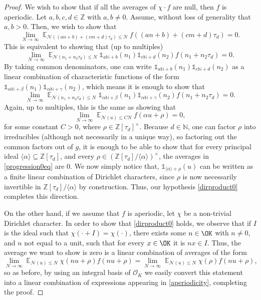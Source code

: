 \documentclass[11pt]{amsart}
\theoremstyle{definition}
\DeclareMathOperator*{\E}{\mathbb{E}}
\newcommand{\N}{{\mathbb N}}
\newcommand{\NN}{{\mathcal N}}
\newcommand{\Z}{{\mathbb Z}}
\begin{document}
\begin{proof}
We wish to show that if all the averages of $\chi\cdot f$ are null, then $f$ is aperiodic. %
Let $a,b,c,d \in \Z$ with $a,b \neq 0$. Assume, without loss of generality that $a, b>0$. Then, we wish to show that
\begin{equation}\label{aperiodicity}
\lim_{N\to\infty}\E_{\NN((an+b)+(cm+d)\tau_{d}) \leq N}f((an+b)+(cm+d)\tau_{d})=0.
\end{equation}
This is equivalent to showing that (up to multiples)
\[
\lim_{N\to\infty}\E_{\NN(n_1+n_2\tau_{d}) \leq N}\mathds{1}_{a\N+b}(n_1)\mathds{1}_{c\N+d}(n_2)f(n_1+n_2\tau_{d})=0.
\]
By taking common denominators, one can write $\mathds{1}_{a\N+b}(n_1)\mathds{1}_{c\N+d}(n_2)$ as a linear combination of characteristic functions of the form $\mathds{1}_{\alpha\N+\beta}(n_1)\mathds{1}_{\alpha\N+\gamma}(n_2)$, which means it is enough to show that
\[
\lim_{N\to\infty}\E_{\NN(n_1+n_2\tau_{d}) \leq N}\mathds{1}_{\alpha\N+\beta}(n_1)\mathds{1}_{\alpha\N+\gamma}(n_2)f(n_1+n_2\tau_{d})=0.
\]
Again, up to multiples, this is the same as showing that
\begin{equation}\label{progression0eq}
\lim_{N\to\infty}\E_{\NN(u) \leq CN} f(\alpha u+\rho)=0,
\end{equation}
for some constant $C>0$, where $\rho \in \Z[\tau_{d}]^{\times}$. Because $d\in\N$, one can factor $\rho$ into irreducibles (although not necessarily in a unique way), so factoring out the common factors out of $g$, it is enough to be able to show that for every principal ideal $\langle \alpha\rangle \subseteq \Z[\tau_{d}]$, and every $\rho \in (\Z[\tau_{d}]/\langle \alpha \rangle)^{\times}$, the averages in \eqref{progression0eq} are 0. We now simply notice that, $\mathds{1}_{\langle \alpha \rangle +\rho}(u)$ can be written as a finite linear combination of Dirichlet characters, since $\rho$ is now necessarily invertible in $\Z[\tau_{d}]/\langle\alpha\rangle$ by construction. Thus, our hypothesis \eqref{dirproduct0} completes this direction.

On the other hand, if we assume that $f$ is aperiodic, let $\chi$ be a non-trivial Dirichlet character. In order to show that \eqref{dirproduct0} holds, we observe that if $I$ is the ideal such that $\chi(\cdot +I)=\chi(\cdot)$, there exists some $n \in \OK$ with $n\neq 0$, and $n$ not equal to a unit, such that for every $x \in \OK$ it is $nx \in I$. Thus, the average we want to show is zero is a linear combination of averages of the form
\[
\lim_{N \to \infty} \E_{\NN(u) \leq N} \chi(nu+\rho)f(nu+\rho)=\lim_{N \to \infty} \E_{\NN(u) \leq N} \chi(\rho)f(nu+\rho),
\]
so as before, by using an integral basis of $\mathcal{O}_K$ we easily convert this statement into a linear combination of expressions appearing in \eqref{aperiodicity}, completing the proof.
\fi
\end{proof}
\end{document}
